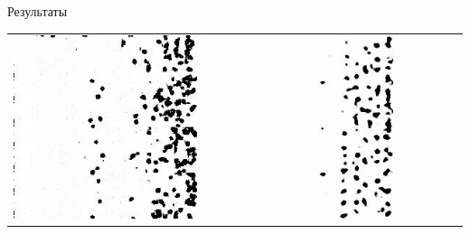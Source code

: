 \documentclass[12pt]{beamer}
\begin{document}
\begin{frame}{Результаты}
\begin{table}
\begin{center}
\begin{tabular}{p{1.2cm} p{1.2cm} p{1.2cm} p{1.2cm} p{1.2cm} p{1.2cm} p{1.2cm}}
					\includegraphics[width=1\linewidth]{8-results/sand-trend2/nf16/gen1}
					&
					\includegraphics[width=1\linewidth]{8-results/sand-trend2/nf16_woUnet/gen1}
					&

\end{tabular}
\end{center}
\end{table}
\end{frame}
\end{document}
